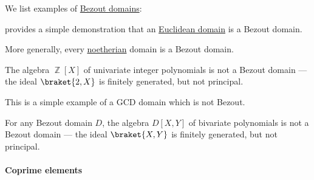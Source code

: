 \begin{example}\label{ex:def:bezout_domain}
  We list examples of \hyperref[def:bezout_domain]{Bezout domains}:
  \begin{thmenum}
      provides a simple demonstration that an \hyperref[def:euclidean_domain]{Euclidean domain} is a Bezout domain.

     More generally, every \hyperref[def:noetherian_semiring]{noetherian} domain is a Bezout domain.

     The algebra \( \BbbZ[X] \) of univariate integer polynomials is not a Bezout domain --- the ideal \( \braket{ 2, X } \) is finitely generated, but not principal.

    This is a simple example of a GCD domain which is not Bezout.

     For any Bezout domain \( D \), the algebra \( D[X, Y] \) of bivariate polynomials is not a Bezout domain --- the ideal \( \braket{ X, Y } \) is finitely generated, but not principal.
  \end{thmenum}
\end{example}

\paragraph{Coprime elements}

